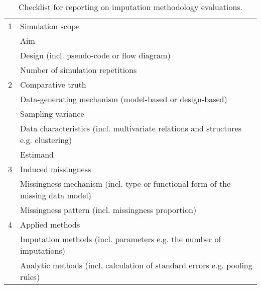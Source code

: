 \documentclass[bimj,fleqn]{w-art}
\begin{document}
\begin{table}[ht]
\caption{Checklist for reporting on imputation methodology evaluations.}
\label{table:check}
\begin{tabular}{ll}
\hline
1 & Simulation scope                                                                   \\ \cline{2-2}
  & Aim                                                                                \\
  & Design (incl. pseudo-code or flow diagram)                                         \\
  & Number of simulation repetitions                                                   \\ \hline
2 & Comparative truth                                                                  \\ \cline{2-2}
  & Data-generating mechanism (model-based or design-based)                            \\
  & Sampling variance                                                                  \\
  & Data characteristics (incl. multivariate relations and structures e.g. clustering) \\
  & Estimand                                                                           \\ \hline 
3 & Induced missingness                                                                \\ \cline{2-2}
  & Missingness mechanism (incl. type or functional form of the missing data   model)  \\
  & Missingness pattern (incl. missingness proportion)                                 \\ \hline 
4 & Applied methods                                                                    \\ \cline{2-2}
  & Imputation methods (incl. parameters e.g. the number of imputations)               \\
  & Analytic methods (incl. calculation of standard errors e.g. pooling   rules)       \\

\end{tabular}
\end{table}
\end{document}

